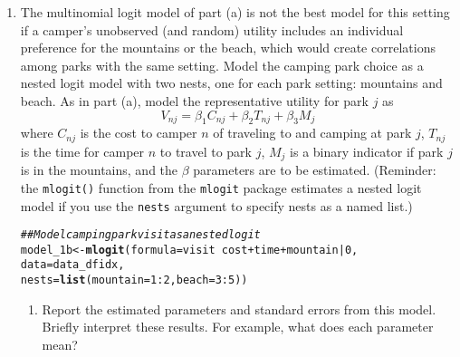 \documentclass[11pt,letterpaper]{article}\usepackage[]{graphicx}\usepackage[]{color}
\makeatletter
\newcommand{\hlnum}[1]{\textcolor[rgb]{0.686,0.059,0.569}{#1}}%
\newcommand{\hlcom}[1]{\textcolor[rgb]{0.678,0.584,0.686}{\textit{#1}}}%
\newcommand{\hlopt}[1]{\textcolor[rgb]{0,0,0}{#1}}%
\newcommand{\hlstd}[1]{\textcolor[rgb]{0.345,0.345,0.345}{#1}}%
\newcommand{\hlkwb}[1]{\textcolor[rgb]{0.69,0.353,0.396}{#1}}%
\newcommand{\hlkwc}[1]{\textcolor[rgb]{0.333,0.667,0.333}{#1}}%
\newcommand{\hlkwd}[1]{\textcolor[rgb]{0.737,0.353,0.396}{\textbf{#1}}}%
\newenvironment{kframe}{%
 \def\at@end@of@kframe{}%
 \ifinner\ifhmode%
  \def\at@end@of@kframe{\end{minipage}}%
  \begin{minipage}{\columnwidth}%
 \fi\fi%
 \def\FrameCommand##1{\hskip\@totalleftmargin \hskip-\fboxsep
 \colorbox{shadecolor}{##1}\hskip-\fboxsep
     \hskip-\linewidth \hskip-\@totalleftmargin \hskip\columnwidth}%
 \MakeFramed {\advance\hsize-\width
   \@totalleftmargin\z@ \linewidth\hsize
   \@setminipage}}%
 {\par\unskip\endMakeFramed%
 \at@end@of@kframe}
\newenvironment{knitrout}{}{} %
\makeatother
\begin{document}
\begin{enumerate}[label=\alph*., leftmargin=*]
	\item The multinomial logit model of part (a) is not the best model for this setting if a camper's unobserved (and random) utility includes an individual preference for the mountains or the beach, which would create correlations among parks with the same setting. Model the camping park choice as a nested logit model with two nests, one for each park setting: mountains and beach. As in part (a), model the representative utility for park $j$ as
	$$V_{nj} = \beta_1 C_{nj} + \beta_2 T_{nj} + \beta_3 M_j$$
	where $C_{nj}$ is the cost to camper $n$ of traveling to and camping at park $j$, $T_{nj}$ is the time for camper $n$ to travel to park $j$, $M_j$ is a binary indicator if park $j$ is in the mountains, and the $\beta$ parameters are to be estimated. (Reminder: the \texttt{mlogit()} function from the \texttt{mlogit} package estimates a nested logit model if you use the \texttt{nests} argument to specify nests as a named list.)

\begin{knitrout}
\color{fgcolor}\begin{kframe}
\begin{alltt}
\hlcom{## Model camping park visit as a nested logit}
\hlstd{model_1b} \hlkwb{<-} \hlkwd{mlogit}\hlstd{(}\hlkwc{formula} \hlstd{= visit} \hlopt{~} \hlstd{cost} \hlopt{+} \hlstd{time} \hlopt{+} \hlstd{mountain} \hlopt{|} \hlnum{0}\hlstd{,}
                   \hlkwc{data} \hlstd{= data_dfidx,}
                   \hlkwc{nests} \hlstd{=} \hlkwd{list}\hlstd{(}\hlkwc{mountain} \hlstd{=} \hlnum{1}\hlopt{:}\hlnum{2}\hlstd{,} \hlkwc{beach} \hlstd{=} \hlnum{3}\hlopt{:}\hlnum{5}\hlstd{))}
\end{alltt}
\end{kframe}
\end{knitrout}

	\begin{enumerate}[label=\roman*.]
		\item Report the estimated parameters and standard errors from this model. Briefly interpret these results. For example, what does each parameter mean?


\end{enumerate}
\end{enumerate}
\end{document}
